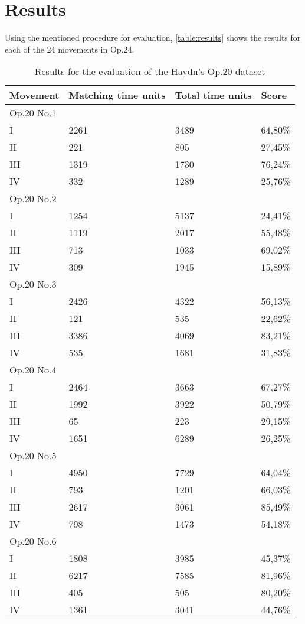 \chapter{Results}
\label{chap:results}

Using the mentioned procedure for evaluation, \autoref{table:results} shows the results for each of the 24 movements in Op.24.

\begin{table}[tbp]
\centering
\begin{tabular}{|l|l|l|l|}
\hline
Movement & Matching time units & Total time units & Score \\ \hline
\multicolumn{4}{|l|}{Op.20 No.1} \\ \hline
I & 2261 & 3489 & 64,80\% \\ \hline
II & 221 & 805 & 27,45\% \\ \hline
III & 1319 & 1730 & 76,24\% \\ \hline
IV & 332 & 1289 & 25,76\% \\ \hline
\multicolumn{4}{|l|}{Op.20 No.2} \\ \hline
I & 1254 & 5137 & 24,41\% \\ \hline
II & 1119 & 2017 & 55,48\% \\ \hline
III & 713 & 1033 & 69,02\% \\ \hline
IV & 309 & 1945 & 15,89\% \\ \hline
\multicolumn{4}{|l|}{Op.20 No.3} \\ \hline
I & 2426 & 4322 & 56,13\% \\ \hline
II & 121 & 535 & 22,62\% \\ \hline
III & 3386 & 4069 & 83,21\% \\ \hline
IV & 535 & 1681 & 31,83\% \\ \hline
\multicolumn{4}{|l|}{Op.20 No.4} \\ \hline
I & 2464 & 3663 & 67,27\% \\ \hline
II & 1992 & 3922 & 50,79\% \\ \hline
III & 65 & 223 & 29,15\% \\ \hline
IV & 1651 & 6289 & 26,25\% \\ \hline
\multicolumn{4}{|l|}{Op.20 No.5} \\ \hline
I & 4950 & 7729 & 64,04\% \\ \hline
II & 793 & 1201 & 66,03\% \\ \hline
III & 2617 & 3061 & 85,49\% \\ \hline
IV & 798 & 1473 & 54,18\% \\ \hline
\multicolumn{4}{|l|}{Op.20 No.6} \\ \hline
I & 1808 & 3985 & 45,37\% \\ \hline
II & 6217 & 7585 & 81,96\% \\ \hline
III & 405 & 505 & 80,20\% \\ \hline
IV & 1361 & 3041 & 44,76\% \\ \hline
\end{tabular}
\caption{Results for the evaluation of the Haydn's Op.20 dataset}
\label{table:results}
\end{table}

